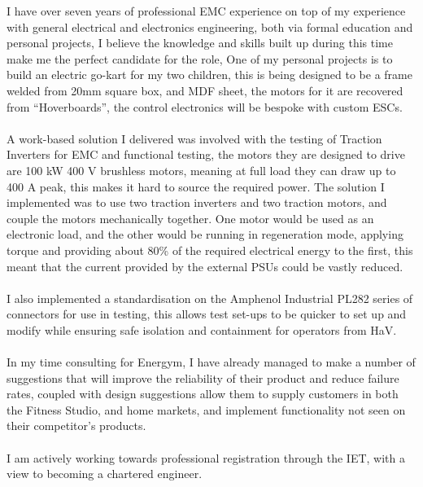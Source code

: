 \begin{multicols}{2}  %
\noindent I have over seven years of professional EMC experience on top of my experience with general electrical and electronics engineering, both via formal education and personal projects, I believe the knowledge and skills built up during this time make me the perfect candidate for the role, One of my personal projects is to build an electric go-kart for my two children, this is being designed to be a frame welded from 20mm square box, and MDF sheet, the motors for it are recovered from “Hoverboards”, the control electronics will be bespoke with custom ESCs.
\\
\\
A work-based solution I delivered was involved with the testing of Traction Inverters for EMC and functional testing, the motors they are designed to drive are 100 kW 400 V brushless motors, meaning at full load they can draw up to 400 A peak, this makes it hard to source the required power. The solution I implemented was to use two traction inverters and two traction motors, and couple the motors mechanically together. One motor would be used as an electronic load, and the other would be running in regeneration mode, applying torque and providing about 80\% of the required electrical energy to the first, this meant that the current provided by the external PSUs could be vastly reduced.
\\
\\
I also implemented a standardisation on the Amphenol Industrial PL282 series of connectors for use in testing, this allows test set-ups to be quicker to set up and modify while ensuring safe isolation and containment for operators from HaV.
\\
\\
In my time consulting for Energym, I have already managed to make a number of suggestions that will improve the reliability of their product and reduce failure rates, coupled with design suggestions allow them to supply customers in both the Fitness Studio, and home markets, and implement functionality not seen on their competitor's products.
\\
\\
I am actively working towards professional registration through the IET, with a view to becoming a chartered engineer.
\\
\\
\end{multicols}